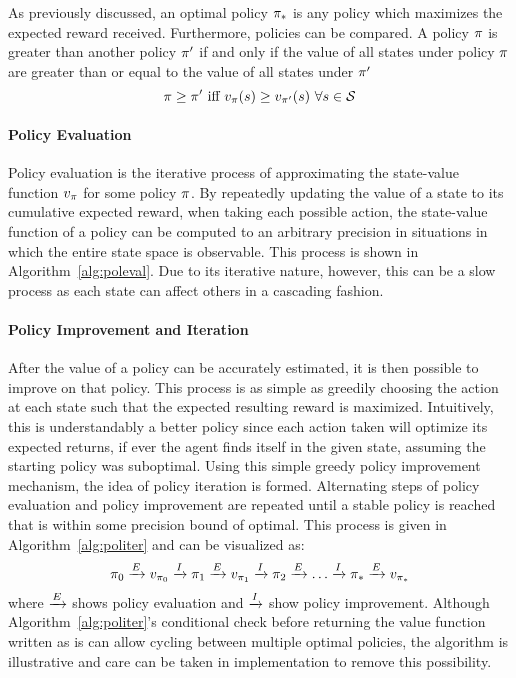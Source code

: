 As previously discussed,
an optimal policy $\pi_*$ is any policy which maximizes the expected reward
received.
%
Furthermore, policies can be compared.
%
A policy $\pi$ is greater than another policy $\pi'$
if and only if the value of all states under policy $\pi$
are greater than or equal to the value of all states under $\pi'$
\[
\policy \ge \policy'\ 
	\text{iff}\ 
	v_\policy(s) \ge v_{\policy'}(s)\ \forall s\in\States
\]


\paragraph*{Policy Evaluation}


Policy evaluation is the iterative process of approximating the state-value
function $v_\pi$ for some policy $\pi$.
%
By repeatedly updating the value of a state
to its cumulative expected reward, when taking each possible action,
the state-value function of a policy can be computed to an
arbitrary precision
in situations in which the entire state space is observable.
%
This process is shown in Algorithm~\ref{alg:poleval}.
%
Due to its iterative nature,
however,
this can be a slow process
as each state can affect others in a cascading fashion.



\paragraph*{Policy Improvement and Iteration}



After the value of a policy can be accurately estimated,
it is then possible to improve on that policy.
% 
This process is as simple as greedily choosing the action at each state such
that the expected resulting reward is maximized.
%
Intuitively,
this is understandably a better policy
since each action taken will optimize its expected returns,
if ever the
agent finds itself in the given state,
assuming the starting policy was suboptimal.
%
Using this simple greedy policy improvement mechanism,
the idea of policy iteration is formed.
%
Alternating steps of policy evaluation and policy improvement are repeated
until a stable policy is reached that is within some precision bound of  optimal.
%
This process is given in Algorithm~\ref{alg:politer}
and can be visualized as:
\[
	\pi_0 \xrightarrow{E} v_{\pi_0} \xrightarrow{I}
	\pi_1 \xrightarrow{E} v_{\pi_1} \xrightarrow{I}
	\pi_2 \xrightarrow{E} \ldots \xrightarrow{I}
	\pi_* \xrightarrow{E} v_{\pi_*}
\]
where $\xrightarrow{E}$ shows policy evaluation and $\xrightarrow{I}$ show policy improvement.
%
Although Algorithm~\ref{alg:politer}'s conditional check before
returning the value function written as is
can allow cycling between multiple optimal
policies,
the algorithm is illustrative
and care can be taken in implementation to remove this possibility.

